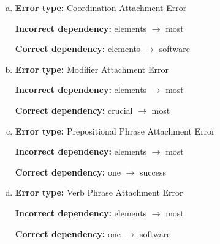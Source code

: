 \begin{enumerate}[1.]
\begin{enumerate}[(a)]
\item {\bf Error type:} Coordination Attachment Error

{\bf Incorrect dependency:} elements $\rightarrow$ most 

{\bf Correct dependency:} elements $\rightarrow$ software

\item {\bf Error type:} Modifier Attachment Error 

{\bf Incorrect dependency:} elements $\rightarrow$ most 

{\bf Correct dependency:} crucial $\rightarrow$ most

\item {\bf Error type:} Prepositional Phrase Attachment Error

{\bf Incorrect dependency:} elements $\rightarrow$ most

{\bf Correct dependency:} one $\rightarrow$ success

\item {\bf Error type:} Verb Phrase Attachment Error

{\bf Incorrect dependency:} elements $\rightarrow$ most

{\bf Correct dependency:} one $\rightarrow$ software

\end{enumerate}


\end{enumerate}